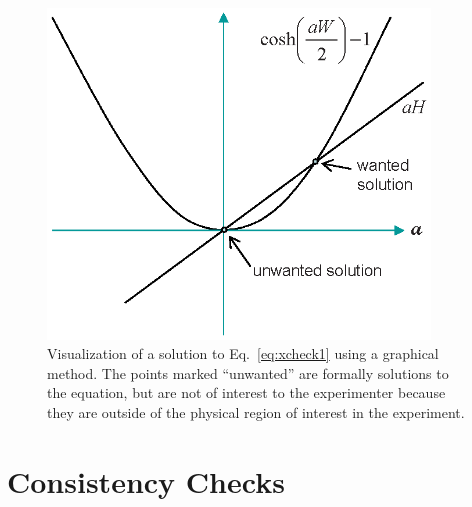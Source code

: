 \documentclass{revtex4}
\begin{document}
\begin{figure}
\includegraphics[width=4in]{crosscheck1fig.eps}
\caption{\label{fig:checks}
Visualization of a solution to Eq.~\ref{eq:xcheck1} using a graphical method.
The points marked ``unwanted'' are formally solutions to the equation, but
are not of interest to the experimenter because they are outside of the
physical region of interest in the experiment.}
\end{figure}

\section{Consistency Checks}
\end{document}

